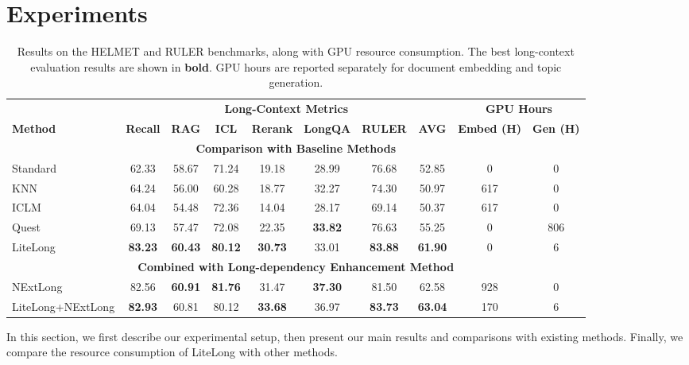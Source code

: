 \documentclass{article}
\theoremstyle{plain}
\theoremstyle{definition}
\theoremstyle{remark}
\begin{document}
\section{Experiments}

\begin{table}[!tbp]
    \centering
    \small
    \begin{tabular}{lccccccc|cc}
    \toprule
    & \multicolumn{7}{c|}{\textbf{Long-Context Metrics}} & \multicolumn{2}{c}{\textbf{GPU Hours}} \\
    \cmidrule(lr){2-8} \cmidrule(lr){9-10}
    \textbf{Method} & \textbf{Recall} & \textbf{RAG} & \textbf{ICL} & \textbf{Rerank} & \textbf{LongQA} & \textbf{RULER} & \textbf{AVG} & \textbf{Embed (H)} & \textbf{Gen (H)} \\
    \midrule
    \multicolumn{10}{c}{\textbf{Comparison with Baseline Methods}} \\
    \midrule
    Standard & 62.33 & 58.67 & 71.24 & 19.18 & 28.99 & 76.68 & 52.85 & 0 & 0 \\
    KNN & 64.24 & 56.00 & 60.28 & 18.77 & 32.27 & 74.30 & 50.97 & 617 & 0 \\
    ICLM & 64.04 & 54.48 & 72.36 & 14.04 & 28.17 & 69.14 & 50.37 & 617 & 0 \\
    Quest & 69.13 & 57.47 & 72.08 & 22.35 & \textbf{33.82} & 76.63 & 55.25 & 0 & 806 \\
    LiteLong & \textbf{83.23} & \textbf{60.43} & \textbf{80.12} & \textbf{30.73} & 33.01 & \textbf{83.88} & \textbf{61.90} & 0 & 6 \\
    \midrule
    \multicolumn{10}{c}{\textbf{Combined with Long-dependency Enhancement Method}} \\
    \midrule
    NExtLong & 82.56 & \textbf{60.91} & \textbf{81.76} & 31.47 & \textbf{37.30} & 81.50 & 62.58 & 928 & 0 \\
    LiteLong+NExtLong & \textbf{82.93} & 60.81 & 80.12 & \textbf{33.68} & 36.97 & \textbf{83.73} & \textbf{63.04} & 170 & 6 \\
    \bottomrule
    \end{tabular}
    \caption{Results on the HELMET and RULER benchmarks, along with GPU resource consumption. The best long-context evaluation results are shown in \textbf{bold}. GPU hours are reported separately for document embedding and topic generation.}
    \label{tab:main_results}
\end{table}


    

In this section, we first describe our experimental setup, then present our main results and comparisons with existing methods. Finally, we compare the resource consumption of LiteLong with other methods.
\end{document}

